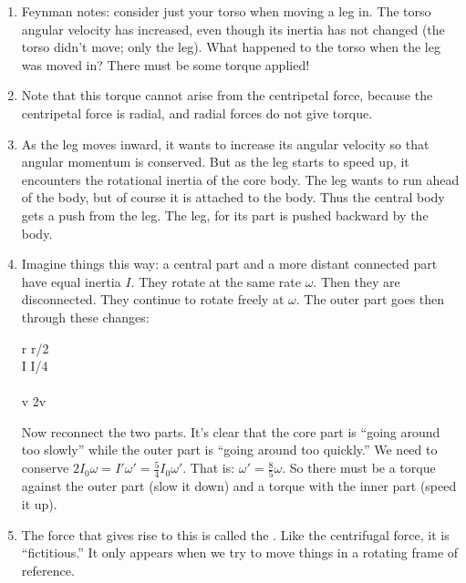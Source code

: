 \begin{enumerate}

  \item Feynman notes: consider just your torso when moving a leg in.
  The torso angular velocity has increased, even though its inertia has
  not changed (the torso didn't move; only the leg). What happened to
  the torso when the leg was moved in? There must be some torque
  applied!

  \item Note that this torque cannot arise from the centripetal force,
  because the centripetal force is radial, and radial forces do not give
  torque.

  \item As the leg moves inward, it wants to increase its angular
  velocity so that angular momentum is conserved. But as the leg starts
  to speed up, it encounters the rotational inertia of the core body.
  The leg wants to run ahead of the body, but of course it is attached
  to the body. Thus the central body gets a push from the leg. The leg,
  for its part is pushed backward by the body.

  \item Imagine things this way: a central part and a more distant
  connected part have equal inertia $I$. They rotate at the same rate
  $\omega$. Then they are disconnected. They continue to rotate freely
  at $\omega$. The outer part goes then through these changes:

  \begin{nedqn}
    r \mapstocol r/2
  \\
    I \mapstocol I/4
  \\
    \omega {}\omega
  \\
    v \mapstocol 2v
  \end{nedqn}

  \noindent
  Now reconnect the two parts. It's clear that the core part is ``going
  around too slowly'' while the outer part is ``going around too
  quickly.'' We need to conserve $2I_0 \omega = I' \omega' = \frac{5}{4}
  I_0 \omega'$. That is: $\omega' = \frac{8}{5} \omega$. So there must
  be a torque against the outer part (slow it down) and a torque with
  the inner part (speed it up).

  \item The force that gives rise to this is called the . Like the centrifugal force, it is ``fictitious.'' It only
  appears when we try to move things in a rotating frame of reference.


\end{enumerate}
